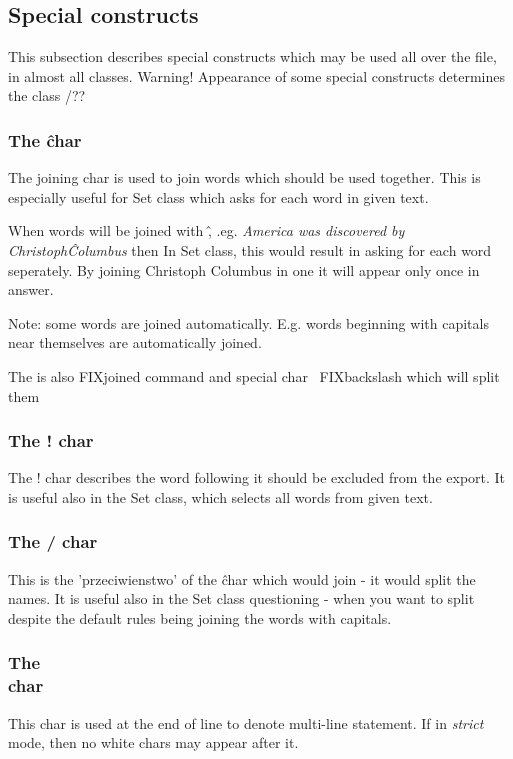 \documentclass[a4paper,11pt]{article}
\begin{document}
\subsection{Special constructs}

This subsection describes special constructs which may be used all over the
file, in almost all classes.
Warning! Appearance of some special constructs determines the class /??

\subsubsection{The \^ char}
The joining char is used to join words which should be used together.
This is especially useful for Set class which asks for each word in given text.


When words will be joined with \^ , .eg. \textit{America was discovered by
Christoph\^Columbus} then
In Set class, this would result in asking for each word seperately. By joining
Christoph Columbus in one it will appear only once in answer.

Note: some words are joined automatically. E.g. words beginning with capitals
near themselves are automatically joined.

The is also FIXjoined command and special char \ FIXbackslash which will split
them

\subsubsection{The ! char}
The ! char describes the word following it should be excluded from the export.
It is useful also in the Set class, which selects all words from given text.


\subsubsection{The / char}
This is the 'przeciwienstwo' of the \^ char which would join - it would split
the names. It is useful also in the Set class questioning - when you want to
split despite the default rules being joining the words with capitals.

\subsubsection{The \\ char}
This char is used at the end of line to denote multi-line statement.
If in \textit{strict} mode, then no white chars may appear after it.
\end{document}
